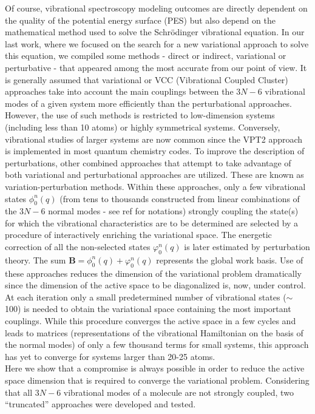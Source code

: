 	Of course, vibrational spectroscopy modeling outcomes are directly dependent on the quality of the potential energy surface (PES) but also depend on the mathematical method used to solve the Schrödinger vibrational equation. In our last work,\cite{garnier2016adaptive} where we focused on the search for a new variational approach to solve this equation, we compiled some methods - direct or indirect, variational or perturbative - that appeared among the most accurate from our point of view. It is generally assumed that variational or VCC (Vibrational Coupled Cluster) approaches take into account the main couplings between the $3N - 6$ vibrational modes of a given system more efficiently than the perturbational approaches. However, the use of such methods is restricted to low-dimension systems (including less than 10 atoms) or highly symmetrical systems. Conversely, vibrational studies of larger systems are now common since the VPT2 approach is implemented in most quantum chemistry codes. To improve the description of perturbations, other combined approaches that attempt to take advantage of both variational and perturbational approaches are utilized. These are known as variation-perturbation methods. Within these approaches, only a few vibrational states $\phi_0^n (q)$ (from tens to thousands constructed from linear combinations of the $3N - 6$ normal modes - see ref\cite{garnier2016adaptive} for notations) strongly coupling the state(s) for which the vibrational characteristics are to be determined are selected by a procedure of interactively enriching the variational space. The energetic correction of all the non-selected states $\varphi_0^n (q)$ is later estimated by perturbation theory. The sum $\textbf{B} = \phi_0^n (q) + \varphi_0^n (q)$ represents the global work basis. Use of these approaches reduces the dimension of the variational problem dramatically\cite{baraille2001calculation,scribano2008iterative} since the dimension of the active space to be diagonalized is, now, under control. At each iteration only a small predetermined number of vibrational states ($\sim$ 100) is needed to obtain the variational space containing the most important couplings. While this procedure converges the active space in a few cycles and leads to matrices (representations of the vibrational Hamiltonian on the basis of the normal modes) of only a few thousand terms for small systems, this approach has yet to converge for systems larger than 20-25 atoms.\\
	
	 Here we show that a compromise is always possible in order to reduce the active space dimension that is required to converge the variational problem. Considering that all $3N-6$ vibrational modes of a molecule are not strongly coupled, two “truncated” approaches were developed and tested.\\
	
